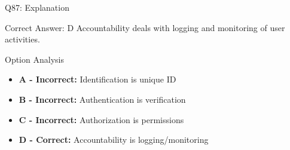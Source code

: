 \documentclass{beamer}
\begin{document}
	\begin{frame}{Q87: Explanation}
		\begin{block}{Correct Answer: D}
			Accountability deals with logging and monitoring of user activities.
		\end{block}
		\begin{block}{Option Analysis}
			\begin{itemize}
				\item \textbf{A - Incorrect:} Identification is unique ID
				\item \textbf{B - Incorrect:} Authentication is verification
				\item \textbf{C - Incorrect:} Authorization is permissions
				\item \textbf{D - Correct:} Accountability is logging/monitoring
			\end{itemize}
		\end{block}
	\end{frame}
	
\end{document}
